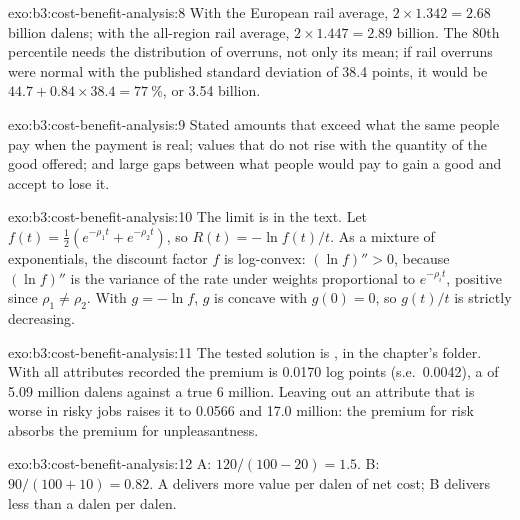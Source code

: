 \begin{solution}{exo:b3:cost-benefit-analysis:8}
With the European rail average, $2 \times 1.342 = 2.68$ billion dalens; with the all-region rail
average, $2 \times 1.447 = 2.89$ billion. The 80th percentile needs the distribution of overruns,
not only its mean; if rail overruns were normal with the published standard
deviation of 38.4 points, it would be $44.7 + 0.84 \times 38.4 = 77~\%$, or 3.54 billion.
\end{solution}

\begin{solution}{exo:b3:cost-benefit-analysis:9}
Stated amounts that exceed what the same people pay when the payment is real; values
that do not rise with the quantity of the good offered; and large gaps between what
people would pay to gain a good and accept to lose it.
\end{solution}

\begin{solution}{exo:b3:cost-benefit-analysis:10}
The limit is in the text. Let $f(t) = \tfrac12(e^{-\rho_1t} + e^{-\rho_2t})$, so $R(t) = -\ln f(t)/t$. As a mixture of exponentials, the
discount factor $f$ is log-convex: $(\ln f)'' > 0$, because $(\ln f)''$ is the variance of the rate under
weights proportional to $e^{-\rho_it}$, positive since $\rho_1 \ne \rho_2$. With $g = -\ln f$, $g$ is concave with $g(0) = 0$, so
$g(t)/t$ is strictly decreasing.
\end{solution}

\begin{solution}{exo:b3:cost-benefit-analysis:11}
The tested solution is , in the chapter's 
folder. With all attributes recorded the premium is 0.0170 log points (s.e.\ 0.0042),
a  of 5.09 million dalens against a true 6 million. Leaving
out an attribute that is worse in risky jobs raises it to 0.0566 and 17.0 million: the
premium for risk absorbs the premium for unpleasantness. %
\end{solution}

\begin{solution}{exo:b3:cost-benefit-analysis:12}
A: $120/(100 - 20) = 1.5$. B: $90/(100 + 10) = 0.82$. A delivers more value per dalen of net cost;
B delivers less than a dalen per dalen.
\end{solution}

